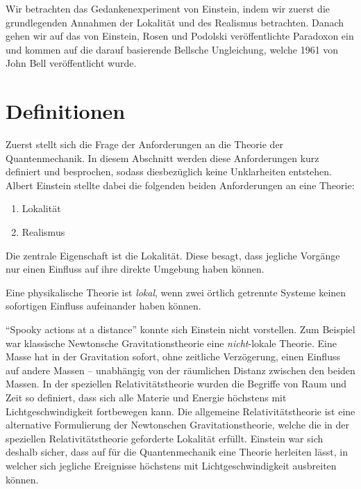 \begin{refsection}
Wir betrachten das Gedankenexperiment von Einstein, indem wir zuerst die
grundlegenden Annahmen der Lokalit\"at und des Realismus betrachten. Danach
gehen wir auf das von Einstein, Rosen und Podolski ver\"offentlichte Paradoxon
ein und kommen auf die darauf basierende Bellsche Ungleichung, welche
1961 von John Bell ver\"offentlicht wurde.

\section{Definitionen\label{section:bell:definitionen}}
Zuerst stellt sich die Frage der Anforderungen an die Theorie der
Quantenmechanik.
In diesem Abschnitt werden diese Anforderungen kurz definiert und
besprochen, sodass diesbez\"uglich keine Unklarheiten entstehen.
Albert Einstein stellte dabei die folgenden beiden Anforderungen an eine
Theorie:

\begin{enumerate}
    \item Lokalit\"at
    \item Realismus
\end{enumerate}

Die zentrale Eigenschaft ist die Lokalit\"at.
Diese besagt, dass jegliche Vorg\"ange nur einen Einfluss
auf ihre direkte Umgebung haben k\"onnen.

\begin{definition}\label{def:bell:lokalitaet}
    Eine physikalische Theorie ist \emph{lokal}, wenn zwei \"ortlich getrennte
    Systeme keinen sofortigen Einfluss aufeinander haben k\"onnen.
\end{definition}

\foreignquote{english}{Spooky actions at a distance} \cite[S.~158]{Bell:BornEinstein1971}
konnte sich Einstein nicht vorstellen.
Zum Beispiel war klassische Newtonsche Gravitationstheorie
eine \emph{nicht}-lokale Theorie. 
Eine Masse hat in der Gravitation sofort, ohne zeitliche 
Verz\"ogerung, einen Einfluss auf andere Massen -- unabh\"angig von der
r\"aumlichen Distanz zwischen den beiden Massen. 
In der speziellen Relativit\"atstheorie wurden die Begriffe von Raum und Zeit
so definiert, dass sich alle Materie und Energie h\"ochstens mit
Lichtgeschwindigkeit fortbewegen kann. 
Die allgemeine Relativit\"atstheorie ist eine alternative Formulierung
der Newtonschen Gravitationstheorie, welche die in der speziellen
Relativit\"atstheorie geforderte Lokalit\"at erf\"ullt.
Einstein war sich deshalb sicher, dass auf f\"ur die Quantenmechanik eine
Theorie herleiten l\"asst, in welcher sich jegliche Ereignisse h\"ochstens mit
Lichtgeschwindigkeit ausbreiten k\"onnen.


\end{refsection}
